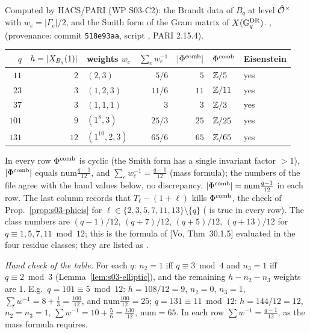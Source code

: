\begin{example}[T1 data]\label{ex:s03-mazur}
Computed by HACS/PARI (WP S03-C2): the Brandt data of $B_q$ at level $\hat{\mathcal{O}}^\times$ with $w_e=|\Gamma_e|/2$, and the Smith form of the Gram matrix of $X(\mathbb{G}^{\mathrm{DR}}_q)$.
\stcomp{},  (provenance: commit \texttt{518e93aa}, script , PARI 2.15.4).
\begin{center}\small
\begin{tabular}{rrlrrll}\toprule
$q$ & $h=|X_{B_q}(1)|$ & weights $w_e$ & $\sum_ew_e^{-1}$ & $|\Phi^{\mathrm{comb}}|$ & $\Phi^{\mathrm{comb}}$ & Eisenstein\\\midrule
$11$ & $2$ & $(2,3)$ & $5/6$ & $5$ & $\mathbb{Z}/5$ & yes\\
$23$ & $3$ & $(1,2,3)$ & $11/6$ & $11$ & $\mathbb{Z}/11$ & yes\\
$37$ & $3$ & $(1,1,1)$ & $3$ & $3$ & $\mathbb{Z}/3$ & yes\\
$101$ & $9$ & $(1^8,3)$ & $25/3$ & $25$ & $\mathbb{Z}/25$ & yes\\
$131$ & $12$ & $(1^{10},2,3)$ & $65/6$ & $65$ & $\mathbb{Z}/65$ & yes\\\bottomrule
\end{tabular}
\end{center}
In every row $\Phi^{\mathrm{comb}}$ is cyclic (the Smith form has a single invariant factor $>1$), $|\Phi^{\mathrm{comb}}|$ equals $\mathrm{num}\frac{q-1}{12}$, and $\sum_ew_e^{-1}=\frac{q-1}{12}$
(mass formula); the numbers of the file agree with the hand values below, no discrepancy. $|\Phi^{\mathrm{comb}}|=\mathrm{num}\frac{q-1}{12}$ in each row. The last column records that $T_\ell-(1+\ell)$ kills $\Phi^{\mathrm{comb}}$, the check of
Prop.~\ref{prop:s03-phieis} for $\ell\in\{2,3,5,7,11,13\}\setminus\{q\}$ ( is true in every row). The class numbers are $(q-1)/12$, $(q+7)/12$, $(q+5)/12$, $(q+13)/12$ for
$q\equiv1,5,7,11\bmod12$; this is the formula of [Vo, Thm~30.1.5]  evaluated in the four residue
classes; they are listed as .
\end{example}
\noindent\emph{Hand check of the table.} For each $q$: $n_2=1$ iff $q\equiv3\bmod4$ and $n_3=1$ iff $q\equiv2\bmod3$ (Lemma~\ref{lem:s03-elliptic}), and the
remaining $h-n_2-n_3$ weights are $1$. E.g.\ $q=101\equiv5\bmod12$: $h=108/12=9$, $n_2=0$, $n_3=1$, $\sum w^{-1}=8+\frac13=\frac{100}{12}$, and
$\mathrm{num}\frac{100}{12}=25$; $q=131\equiv11\bmod12$: $h=144/12=12$, $n_2=n_3=1$, $\sum w^{-1}=10+\frac56=\frac{130}{12}$, $\mathrm{num}=65$. In each row
$\sum w^{-1}=\frac{q-1}{12}$, as the mass formula requires.

